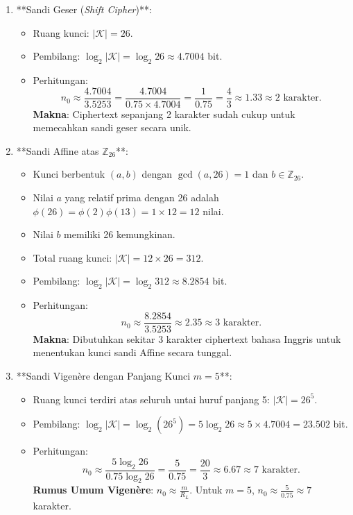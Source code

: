 \documentclass[11pt,a4paper]{article}
\begin{document}
\begin{enumerate}[leftmargin=*]
    \item **Sandi Geser (\textit{Shift Cipher})**:
    \begin{itemize}
        \item Ruang kunci: $|\mathcal{K}| = 26$.
        \item Pembilang: $\log_2 |\mathcal{K}| = \log_2 26 \approx 4.7004$ bit.
        \item Perhitungan:
        \[
        n_0 \approx \frac{4.7004}{3.5253} = \frac{4.7004}{0.75 \times 4.7004} = \frac{1}{0.75} = \frac{4}{3} \approx 1.33 \approx 2 \text{ karakter}.
        \]
        \textbf{Makna}: Ciphertext sepanjang 2 karakter sudah cukup untuk memecahkan sandi geser secara unik.
    \end{itemize}

    \item **Sandi Affine atas $\mathbb{Z}_{26}$**:
    \begin{itemize}
        \item Kunci berbentuk $(a, b)$ dengan $\gcd(a, 26) = 1$ dan $b \in \mathbb{Z}_{26}$.
        \item Nilai $a$ yang relatif prima dengan 26 adalah $\phi(26) = \phi(2)\phi(13) = 1 \times 12 = 12$ nilai.
        \item Nilai $b$ memiliki 26 kemungkinan.
        \item Total ruang kunci: $|\mathcal{K}| = 12 \times 26 = 312$.
        \item Pembilang: $\log_2 |\mathcal{K}| = \log_2 312 \approx 8.2854$ bit.
        \item Perhitungan:
        \[
        n_0 \approx \frac{8.2854}{3.5253} \approx 2.35 \approx 3 \text{ karakter}.
        \]
        \textbf{Makna}: Dibutuhkan sekitar 3 karakter ciphertext bahasa Inggris untuk menentukan kunci sandi Affine secara tunggal.
    \end{itemize}

    \item **Sandi Vigen\`ere dengan Panjang Kunci $m = 5$**:
    \begin{itemize}
        \item Ruang kunci terdiri atas seluruh untai huruf panjang 5: $|\mathcal{K}| = 26^5$.
        \item Pembilang: $\log_2 |\mathcal{K}| = \log_2(26^5) = 5 \log_2 26 \approx 5 \times 4.7004 = 23.502$ bit.
        \item Perhitungan:
        \[
        n_0 \approx \frac{5 \log_2 26}{0.75 \log_2 26} = \frac{5}{0.75} = \frac{20}{3} \approx 6.67 \approx 7 \text{ karakter}.
        \]
        \textbf{Rumus Umum Vigen\`ere}: $n_0 \approx \frac{m}{R_L}$. Untuk $m = 5$, $n_0 \approx \frac{5}{0.75} \approx 7$ karakter.
    \end{itemize}


\end{enumerate}
\end{document}
